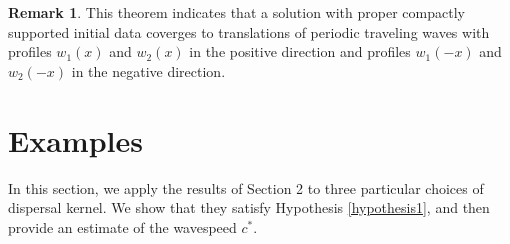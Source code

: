 \documentclass[11pt]{article}
\theoremstyle{definition}
\newtheorem{rem}[thm]{Remark}
\numberwithin{equation}{section}
\numberwithin{thm}{section}
\begin{document}
\begin{rem}
This theorem indicates that a solution with proper compactly supported initial data coverges to translations of periodic traveling waves with profiles $w_1(x)$ and $w_2(x)$ in the positive direction and profiles $w_1(-x)$ and $w_2(-x)$ in the negative direction.
\end{rem}

\section{Examples}

In this section, we apply the results of Section 2 to three particular choices of dispersal kernel. We show that they satisfy Hypothesis \ref{hypothesis1}, and then provide an estimate of the wavespeed $c^*$.
\end{document}
